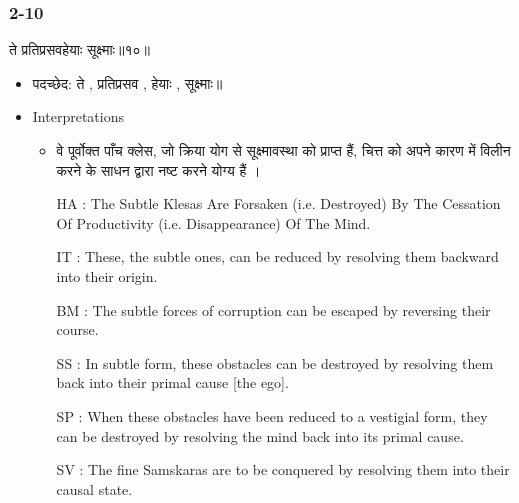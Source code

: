 \begin{frame}[fragile]\frametitle{2-10}
\begin{sanskrit}
ते प्रतिप्रसवहेयाः सूक्ष्माः॥१०॥
\end{sanskrit}

	\begin{itemize}
	\item पदच्छेद: ते , प्रतिप्रसव , हेयाः , सूक्ष्माः॥
	\item Interpretations
		\begin{itemize}
		\item वे पूर्वोक्त पाँच क्लेस, जो क्रिया योग से सूक्ष्मावस्था को प्राप्त हैं, चित्त को अपने कारण में विलीन करने के साधन द्वारा नष्ट करने योग्य हैं ।
		\item [HA]: The Subtle Klesas Are Forsaken (i.e. Destroyed) By The Cessation Of Productivity (i.e. Disappearance) Of The Mind.
		\item [IT]: These, the subtle ones, can be reduced by resolving them backward into their origin.
		\item [BM]: The subtle forces of corruption can be escaped by reversing their course.
		\item [SS]: In subtle form, these obstacles can be destroyed by resolving them back into their primal cause [the ego].
		\item [SP]: When these obstacles have been reduced to a vestigial form, they can be destroyed by resolving the mind back into its primal cause.
		\item [SV]: The fine Samskaras are to be conquered by resolving them into their causal state. 
		\end{itemize}
	\end{itemize}
	
\end{frame}


